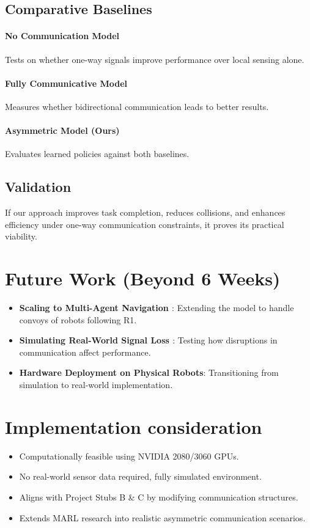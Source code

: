 \documentclass[a4paper,11pt]{article}
\begin{document}
\subsection{Comparative Baselines} 
\paragraph{No Communication Model} Tests on whether one-way signals improve performance over local sensing alone.

\paragraph{Fully Communicative Model} Measures whether bidirectional communication leads to better results.

\paragraph{Asymmetric Model (Ours)} Evaluates learned policies against both baselines.

\subsection{Validation} 
If our approach improves task completion, reduces collisions, and enhances efficiency under one-way communication constraints, it proves its practical viability.

\section*{Future Work (Beyond 6 Weeks)}
\begin{itemize}
    \item \textbf{Scaling to Multi-Agent Navigation \cite{off-beat-MARL}}:  Extending the model to handle convoys of robots following R1.
    \item \textbf{Simulating Real-World Signal Loss \cite{D-MARL}}: Testing how disruptions in communication affect performance.
    \item \textbf{Hardware Deployment on Physical Robots}: Transitioning from simulation to real-world implementation.
\end{itemize}

\section{Implementation consideration}
\begin{itemize}
    \item Computationally feasible using NVIDIA 2080/3060 GPUs.
    \item No real-world sensor data required, fully simulated environment.
    \item Aligns with Project Stubs B \& C by modifying communication structures.
    \item Extends MARL research into realistic asymmetric communication scenarios.
\end{itemize}
\end{document}
